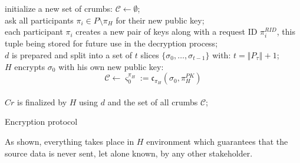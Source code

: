 \documentclass[twoside,twocolumn]{article}
\newcommand{\norm}[1]{\left\Vert#1\right\Vert}
\theoremstyle{definition}
\theoremstyle{remark}
\begin{document}
\begin{algorithm}
    \If{$\norm{d} = 0 \vee \norm{P} < 2$}{
        \throw{invalid input}{}
    }
    initialize a new set of crumbs: $\mathcal{C} \gets \emptyset$; \\
    ask all participants $\pi_i \in P \setminus {\pi_H}$ for their new public key; \\
    each participant $\pi_i$ creates a new pair of keys along with a request ID $\pi_i^{RID}$, this tuple being stored for future use in the decryption 
        process; \\
    $d$ is prepared and split into a set of $t$ slices $\{ \sigma_0, \dots, \sigma_{t-1} \}$ with: $t = \norm{P_\tau} + 1$; \\
    $H$ encrypts $\sigma_0$ with his own new public key:
    \begin{equation}
        \label{eq:crumb0}
        \mathcal{C} \gets \varsigma_0^{\pi_H} := \mathfrak{c}_{\pi_H}(\sigma_0, \pi_H^{PK})
    \end{equation} \\
    $Cr$ is finalized by $H$ using $d$ and the set of all crumbs $\mathcal{C}$; \\
    \caption{Encryption protocol}
    \label{algo:encryption}
\end{algorithm}

As shown, everything takes place in $H$ environment which guarantees that the source data is never sent, let alone known, by any other stakeholder.
\end{document}
